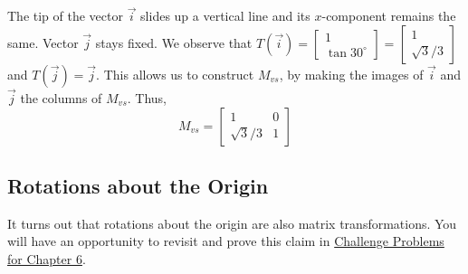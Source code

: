 \documentclass{ximera}
\begin{document}
\begin{example}
\begin{explanation}
The tip of the vector $\vec{i}$ slides up a vertical line and its $x$-component remains the same.  Vector $\vec{j}$ stays fixed.  We observe that $T(\vec{i})=\begin{bmatrix}
1 \\
\tan 30^{\circ}
\end{bmatrix}=\begin{bmatrix}
1 \\
\sqrt{3}/3
\end{bmatrix}$ and $T(\vec{j})=\vec{j}$.  This allows us to construct $M_{vs}$, by making the images of $\vec{i}$ and $\vec{j}$ the columns of $M_{vs}$.  Thus, 
$$M_{vs}=\begin{bmatrix}
1 & 0\\
\sqrt{3}/3 & 1
\end{bmatrix}$$
\end{explanation}
\end{example}



\subsection*{Rotations about the Origin}
It turns out that rotations about the origin are also matrix transformations.  You will have an opportunity to revisit and prove this claim in \href{https://ximera.osu.edu/linearalgebradzv3/nAdditionalProblems/CHLG_linTrans/main}{Challenge Problems for Chapter 6}.
\end{document}
